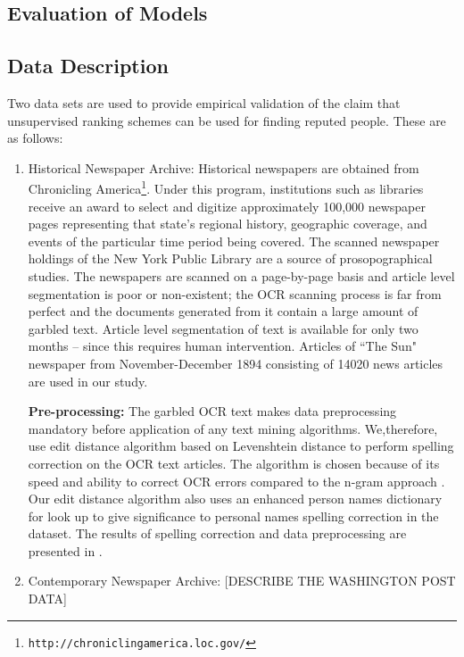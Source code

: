 \documentclass[a4paper,man,natbib]{apa6}
\begin{document}
\subsection{Evaluation of Models}


\subsection{Data Description}
Two data sets are used to provide empirical validation of the claim that unsupervised ranking schemes can be used for finding reputed people. These are as follows:

\begin{enumerate}
\item Historical Newspaper Archive: Historical newspapers are obtained from Chronicling America\footnote{\texttt{http://chroniclingamerica.loc.gov/}}. Under this program, institutions such as libraries receive an award to select and digitize approximately 100,000 newspaper pages representing that state's regional history, geographic coverage, and events of the particular time period being covered. The scanned newspaper holdings of the New York Public Library are a source of prosopographical studies. The newspapers are scanned on a page-by-page basis and article level
segmentation is poor or non-existent; the OCR scanning process is far
from perfect and the documents generated from it contain a large
amount of garbled text. Article level segmentation of text is available for only two months -- since this requires human intervention. Articles of ``The Sun" newspaper from November-December 1894 consisting of 14020 news articles are used in our study. 

\textbf{Pre-processing: } The garbled OCR text makes data preprocessing mandatory before application of any text mining algorithms. We,therefore, use edit distance algorithm based on Levenshtein distance to perform spelling correction on the OCR text articles. The algorithm is chosen because of its speed and ability to correct OCR errors compared to the n-gram approach \cite{chattopadhyaya2013fast}. Our edit distance algorithm also uses an enhanced person names dictionary for look up to give significance to personal names spelling correction in the dataset. The results of spelling correction and data preprocessing are presented in \cite{Gupta_14a}.


\item Contemporary Newspaper Archive: [DESCRIBE THE WASHINGTON POST DATA]
\end{enumerate}
\end{document}
